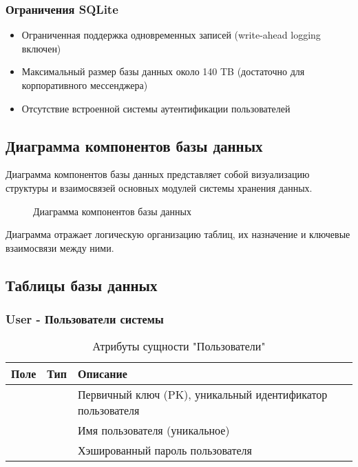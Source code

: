\subsubsection{Ограничения SQLite}
\begin{itemize}
	\item Ограниченная поддержка одновременных записей (write-ahead logging включен)
	\item Максимальный размер базы данных около 140 TB (достаточно для корпоративного мессенджера)
	\item Отсутствие встроенной системы аутентификации пользователей
\end{itemize}

\subsection{Диаграмма компонентов базы данных}

Диаграмма компонентов базы данных представляет собой визуализацию структуры и взаимосвязей основных модулей системы хранения данных.

\begin{figure}[H]
\caption{Диаграмма компонентов базы данных}
\label{comp:image}
\end{figure}

Диаграмма отражает логическую организацию таблиц, их назначение и ключевые взаимосвязи между ними.

\subsection{Таблицы базы данных}
\subsubsection{User - Пользователи системы}
\begin{xltabular}{\textwidth}{|l|l|X|}
	\caption{Атрибуты сущности "Пользователи"\label{user:table}}\\ \hline
	\centrow Поле & \centrow Тип & \centrow Описание \\ \hline
	 &  & Первичный ключ (PK), уникальный идентификатор пользователя \\ \hline
	 &  & Имя пользователя (уникальное) \\ \hline
	 &  & Хэшированный пароль пользователя \\ \hline
\end{xltabular}

